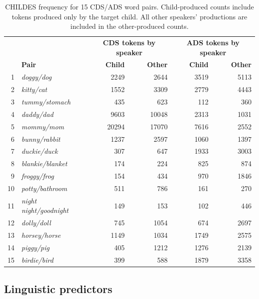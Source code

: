 \documentclass[10pt, letterpaper]{article}
\begin{document}
\begin{table}[ht]
\centering
\fontsize{6}{8}\selectfont
\begin{tabular}{r>{}lrrrr}
  \toprule
\multicolumn{2}{c}{\textbf{ }} & \multicolumn{2}{c}{\textbf{CDS tokens by speaker}} & \multicolumn{2}{c}{\textbf{ADS tokens by speaker}} \\
\cmidrule(l{3pt}r{3pt}){3-4} \cmidrule(l{3pt}r{3pt}){5-6}
\textbf{} & \textbf{Pair} & \textbf{Child} & \textbf{Other} & \textbf{Child} & \textbf{Other }\\ 
  \midrule
1 & \em{doggy/dog} & 2249 & 2644 & 3519 & 5113 \\ 
  2 & \em{kitty/cat} & 1552 & 3309 & 2779 & 4443 \\ 
  3 & \em{tummy/stomach} & 435 & 623 & 112 & 360 \\ 
  4 & \em{daddy/dad} & 9603 & 10048 & 2313 & 1031 \\ 
  5 & \em{mommy/mom} & 20294 & 17070 & 7616 & 2552 \\ 
  6 & \em{bunny/rabbit} & 1237 & 2597 & 1060 & 1397 \\ 
  7 & \em{duckie/duck} & 307 & 647 & 1933 & 3003 \\ 
  8 & \em{blankie/blanket} & 174 & 224 & 825 & 874 \\ 
  9 & \em{froggy/frog} & 154 & 434 & 970 & 1846 \\ 
  10 & \em{potty/bathroom} & 511 & 786 & 161 & 270 \\ 
  11 & \em{night night/goodnight} & 149 & 153 & 102 & 446 \\ 
  12 & \em{dolly/doll} & 745 & 1054 & 674 & 2697 \\ 
  13 & \em{horsey/horse} & 1149 & 1034 & 1749 & 2575 \\ 
  14 & \em{piggy/pig} & 405 & 1212 & 1276 & 2139 \\ 
  15 & \em{birdie/bird} & 399 & 588 & 1879 & 3358 \\ 
   \bottomrule
\end{tabular}
\caption{CHILDES frequency for 15 CDS/ADS word pairs. Child-produced
                             counts include tokens produced only by the target child. All other 
                             speakers' productions are included in the other-produced counts.} 
\label{tab:tab1}
\end{table}

\hypertarget{linguistic-predictors}{%
\subsection{Linguistic predictors}\label{linguistic-predictors}}
\end{document}
